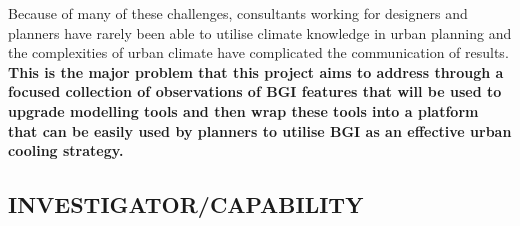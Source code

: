 

Because of many of these challenges, consultants working for designers and planners have rarely been able to utilise climate knowledge in urban planning\cite{Elasson2000} and the complexities of urban climate have complicated the communication of results\cite{Oke2006}. \textbf{This is the major problem that this project aims to address through a focused collection of observations of BGI features that will be used to upgrade modelling tools and then wrap these tools into a platform that can be easily used by planners to utilise BGI as an effective urban cooling strategy.}

\subsection*{\TitleFont INVESTIGATOR/CAPABILITY}




